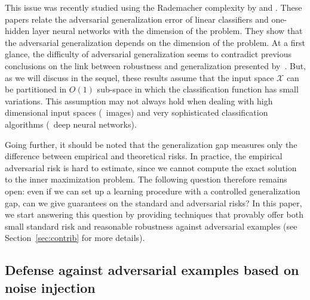 This issue was recently studied using the Rademacher complexity by \cite{khim2018adversarial,yin2019rademacher} and \cite{awasthi2020adversarial}. These papers relate the adversarial generalization error of linear classifiers and one-hidden layer neural networks with the dimension of the problem. They show that the adversarial generalization depends on the dimension of the problem. At a first glance, the difficulty of adversarial generalization seems to contradict previous conclusions on the link between robustness and generalization presented by~\cite{xu2012robustness}. But, as we will discuss in the sequel, these results assume that the input space $\mathcal{X}$ can be partitioned in $O(1)$ sub-space in which the classification function has small variations. This assumption may not always hold when dealing with high dimensional input spaces (\eg~images) and very sophisticated classification algorithms (\eg~deep neural networks).

Going further, it should be noted that the generalization gap
measures only the difference between empirical and theoretical risks. In practice, the empirical adversarial risk is hard to estimate, since we cannot compute the exact solution to the inner maximization problem. The following question therefore remains open: even if we can set up a learning procedure with a controlled generalization gap, can we give guarantees on the standard and adversarial risks? In this paper, we start answering this question by providing techniques that provably offer both small standard risk and reasonable robustness against adversarial examples (see Section~\ref{sec:contrib} for more details).

\subsection{Defense against adversarial examples based on noise injection}

